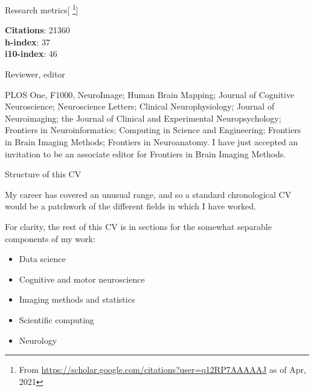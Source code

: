 \documentclass{cv}
\begin{document}
\begin{cvSection}{Research metrics}[
    \footnote{ From
    \url{https://scholar.google.com/citations?user=q12RP7AAAAAJ} as of Apr,
2021}]

{\bf Citations}: 21360 \\
{\bf h-index}: 37 \\
{\bf i10-index}: 46

\end{cvSection}

\begin{cvSection}{Reviewer, editor}

    PLOS One, F1000, NeuroImage; Human Brain Mapping; Journal of Cognitive
    Neuroscience; Neuroscience Letters; Clinical Neurophysiology; Journal of
    Neuroimaging; the Journal of Clinical and Experimental Neuropsychology;
    Frontiers in Neuroinformatics; Computing in Science and Engineering;
    Frontiers in Brain Imaging Methods; Frontiers in Neuroanatomy.  I have just
    accepted an invitation to be an associate editor for Frontiers in Brain
    Imaging Methods.

\end{cvSection}

\begin{cvSection}{Structure of this CV}

        My career has covered an unusual range, and so a standard chronological
        CV would be a patchwork of the different fields in which I have worked.

        For clarity, the rest of this CV is in sections for the somewhat
        separable components of my work:

        \begin{itemize}
            \item Data science
            \item Cognitive and motor neuroscience
            \item Imaging methods and statistics
            \item Scientific computing
            \item Neurology
        \end{itemize}

\end{cvSection}
\end{document}
